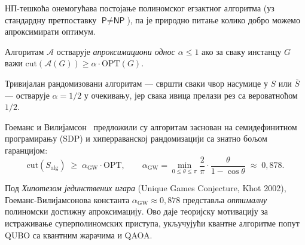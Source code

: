 НП-тешкоћа онемогућава постојање полиномског егзактног алгоритма
(уз стандардну претпоставку $\textsf{P} \neq \textsf{NP}$),
па је природно питање колико добро можемо апроксимирати оптимум.

\begin{definition}
Алгоритам $\mathcal{A}$ остварује \emph{апроксимациони однос $\alpha \leq 1$}
ако за сваку инстанцу $G$ важи
$\mathrm{cut}(\mathcal{A}(G)) \geq \alpha \cdot \mathrm{OPT}(G)$.
\end{definition}

Тривијалан рандомизовани алгоритам — свршти сваки чвор насумице у
$S$ или $\bar S$ — остварује $\alpha = 1/2$ у очекивању,
јер свака ивица прелази рез са вероватноћом $1/2$.

Гоеманс и Вилијамсон~\cite{goemans1995} предложили су алгоритам
заснован на семидефинитном програмирању (SDP) и хиперраванској
рандомизацији са знатно бољом гаранцијом:
\[
  \mathrm{cut}(S_{\mathrm{alg}})
  \;\geq\;
  \alpha_{\mathrm{GW}} \cdot \mathrm{OPT},
  \qquad
  \alpha_{\mathrm{GW}} = \min_{0 \leq \theta \leq \pi}
  \frac{2}{\pi} \cdot \frac{\theta}{1 - \cos\theta}
  \;\approx\; 0{,}878.
\]

\begin{remark}
Под \emph{Хипотезом јединствених игара} (Unique Games Conjecture,
Khot 2002), Гоеманс-Вилијамсонова константа $\alpha_{\mathrm{GW}} \approx 0{,}878$
представља \emph{оптималну} полиномски достижну апроксимацију.
Ово даје теоријску мотивацију за истраживање суперполиномских
приступа, укључујући квантне алгоритме попут QUBO са квантним жарачима и QAOA.
\end{remark}
